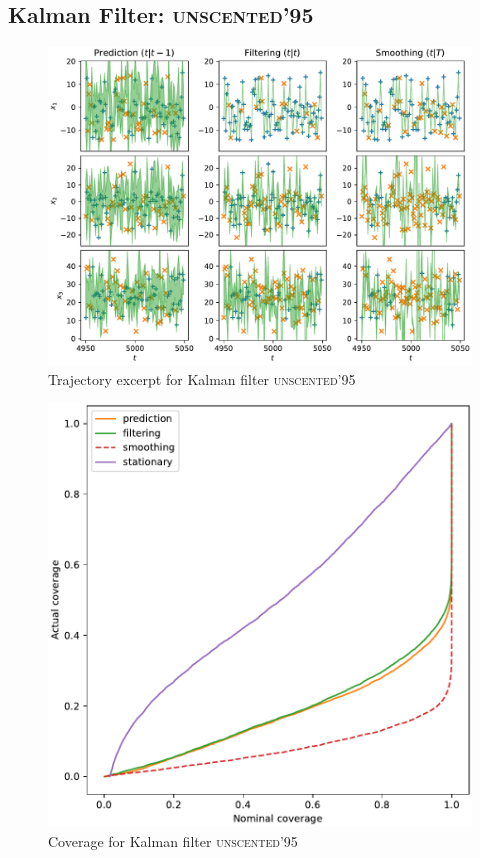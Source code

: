 \subsection{Kalman Filter: {\textsc{unscented'95}}}
\begin{figure}[H]
\begin{center}
\includegraphics[width=\linewidth]{generated/trajectory/Method.UNSCENTED0-Recalibrate.NO.pdf}
\end{center}
\caption{Trajectory excerpt for Kalman filter \textsc{{\textsc{unscented'95}}}}
\end{figure}
\begin{figure}[H]
\begin{center}
\includegraphics[width=\linewidth]{generated/coverage/Method.UNSCENTED0-Recalibrate.NO.pdf}
\end{center}
\caption{Coverage for Kalman filter \textsc{{\textsc{unscented'95}}}}
\end{figure}
